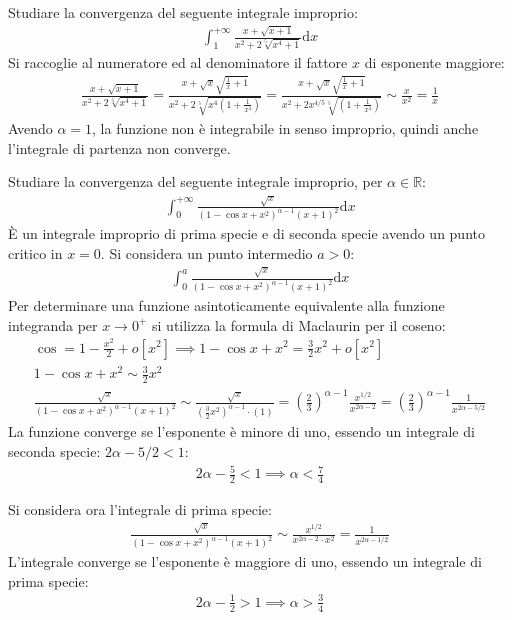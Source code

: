 \documentclass{article}
\newcommand{\df}{\mathrm{d}}
\newcommand{\intab}[4]{\displaystyle\int_{#1}^{#2}{#3}\df{#4}}
\newcommand{\intpinf}[2]{\intab{0}{+\infty}{#1}{#2}}
\numberwithin{equation}{subsection}
\begin{document}
Studiare la convergenza del seguente integrale improprio:
\begin{gather*}
    \displaystyle\int_1^{+\infty}\frac{x+\sqrt{x+1}}{x^2+2\sqrt[5]{x^4+1}}\df x
\end{gather*}
Si raccoglie al numeratore ed al denominatore il fattore $x$ di esponente maggiore:
\begin{gather*}
    \displaystyle\frac{x+\sqrt{x+1}}{x^2+2\sqrt[5]{x^4+1}}=
    \frac{x+\sqrt{x}\sqrt{\frac{1}{x}+1}}{x^2+2\sqrt[5]{x^4\left(1+\frac{1}{x^4}\right)}}=
    \frac{x+\sqrt{x}\sqrt{\frac{1}{x}+1}}{x^2+2x^{4/5}\sqrt[5]{\left(1+\frac{1}{x^4}\right)}}\sim\frac{x}{x^2}=\frac{1}{x}
\end{gather*}
Avendo $\alpha=1$, la funzione non è integrabile in senso improprio, quindi anche l'integrale di partenza non converge. 



Studiare la convergenza del seguente integrale improprio, per $\alpha\in\mathbb{R}$: 
\begin{gather*}
    \intpinf{\frac{\sqrt{x}}{(1-\cos x+x^2)^{\alpha-1}(x+1)^2}}{x}
\end{gather*}
È un integrale improprio di prima specie e di seconda specie avendo un punto critico in $x=0$. Si considera un punto intermedio $a>0$:
\begin{gather*}
    \displaystyle\int_0^a\frac{\sqrt{x}}{(1-\cos x+x^2)^{\alpha-1}(x+1)^2}\df x
\end{gather*}
Per determinare una funzione asintoticamente equivalente alla funzione integranda per $x\to0^+$ si utilizza la formula di Maclaurin per il coseno:
\begin{gather*}
    \cos=1-\displaystyle\frac{x^2}{2}+o[x^2]\implies
    1-\cos x+x^2=\frac{3}{2}x^2+o[x^2]\\
    1-\cos x+x^2\sim\displaystyle\frac{3}{2}x^2\\
    \displaystyle\frac{\sqrt{x}}{(1-\cos x+x^2)^{\alpha-1}(x+1)^2}
    \sim\frac{\sqrt{x}}{(\frac{3}{2}x^2)^{\alpha-1}\cdot(1)}=\left(\frac{2}{3}\right)^{\alpha-1}\frac{x^{1/2}}{x^{2\alpha-2}}=\left(\frac{2}{3}\right)^{\alpha-1}\frac{1}{x^{2\alpha-5/2}}
\end{gather*}
La funzione converge se l'esponente è minore di uno, essendo un integrale di seconda specie: $2\alpha-5/2<1$:
\begin{gather*}
    2\alpha-\displaystyle\frac{5}{2}<1\implies\alpha<\frac{7}{4}
\end{gather*}

Si considera ora l'integrale di prima specie:
\begin{gather*}
    \displaystyle\frac{\sqrt{x}}{(1-\cos x+x^2)^{\alpha-1}(x+1)^2}\sim
    \frac{x^{1/2}}{x^{2\alpha-2}\cdot x^2}=\frac{1}{x^{2\alpha-1/2}}
\end{gather*}
L'integrale converge se l'esponente è maggiore di uno, essendo un integrale di prima specie:
\begin{gather*}
    2\alpha-\displaystyle\frac{1}{2}>1\implies\alpha>\frac{3}{4}
\end{gather*}
\end{document}
